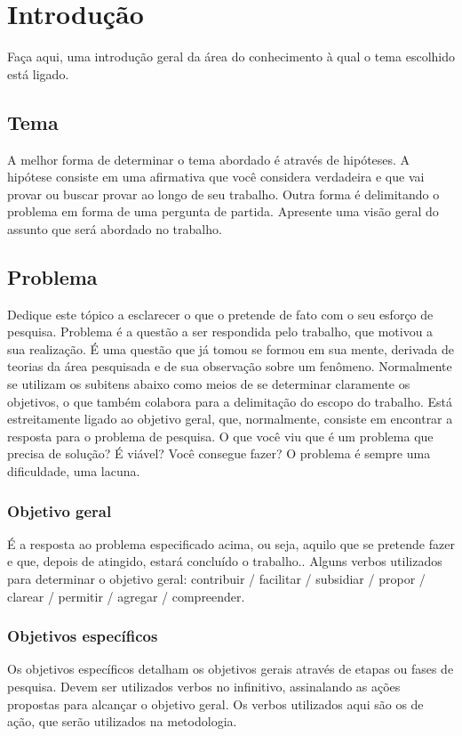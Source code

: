 \chapter{Introdução}
\label{chp:introduction}
Faça aqui, uma introdução geral da área do conhecimento à qual o tema escolhido
está ligado. 

\section{Tema}
A melhor forma de determinar o tema abordado é através de hipóteses. A hipótese
consiste em uma afirmativa que você considera verdadeira e que vai provar ou
buscar provar ao longo de seu trabalho. Outra forma é delimitando o problema em
forma de uma pergunta de partida. Apresente uma visão geral do assunto que será
abordado no trabalho.

\section{Problema}
Dedique este tópico a esclarecer o que o pretende de fato com o seu esforço de
pesquisa. Problema é a questão a ser respondida pelo trabalho, que motivou a sua
realização. É uma questão que já tomou se formou em sua mente, derivada de
teorias da área pesquisada e de sua observação sobre um fenômeno.  Normalmente
se utilizam os subitens abaixo como meios de se determinar claramente os
objetivos, o que também colabora para a delimitação do escopo do trabalho. Está
estreitamente ligado ao objetivo geral, que, normalmente, consiste em encontrar
a resposta para o problema de pesquisa.  O que você viu que é um problema que
precisa de solução? É viável? Você consegue fazer? O problema é sempre uma
dificuldade, uma lacuna.

\subsection{Objetivo geral}
É a resposta ao problema especificado acima, ou seja, aquilo que se pretende
fazer e que, depois de atingido, estará concluído o trabalho.. Alguns verbos
utilizados para determinar o objetivo geral: contribuir / facilitar / subsidiar
/ propor / clarear / permitir / agregar / compreender.

\subsection{Objetivos específicos}
Os objetivos específicos detalham os objetivos gerais através de etapas ou fases
de pesquisa. Devem ser utilizados verbos no infinitivo, assinalando as ações
propostas para alcançar o objetivo geral. Os verbos utilizados aqui são os de
ação, que serão utilizados na metodologia.


